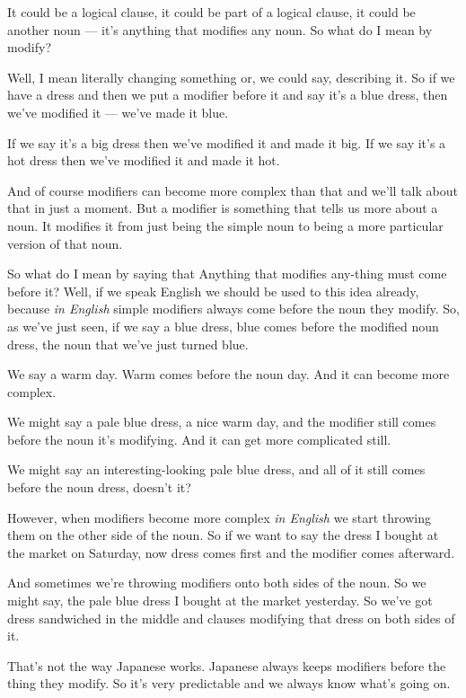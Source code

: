 It could be a logical clause, it could be part of a logical clause, it could be another noun --- it's anything that modifies any noun. So what do I mean by modify?

Well, I mean literally changing something or, we could say, describing it. So if we have a dress and then we put a modifier before it and say it's a blue dress, then we've modified it --- we've made it blue.

{}

If we say it's a big dress then we've modified it and made it big. If we say it's a hot dress then we've modified it and made it hot.

And of course modifiers can become more complex than that and we'll talk about that in just a moment. But a modifier is something that tells us more about a noun. It modifies it from just being the simple noun to being a more particular version of that noun.

So what do I mean by saying that Anything that modifies any-thing must come before it? Well, if we speak English we should be used to this idea already, because {\em in English} simple modifiers always come before the noun they modify. So, as we've just seen, if we say a blue dress, blue comes before the modified noun dress, the noun that we've just turned blue.

We say a warm day. Warm comes before the noun day. And it can become more complex.

We might say a pale blue dress, a nice warm day, and the modifier still comes before the noun it's modifying. And it can get more complicated still.

We might say an interesting-looking pale blue dress, and all of it still comes before the noun dress, doesn't it?

{}

However, when modifiers become more complex {\em in English} we start throwing them on the other side of the noun. So if we want to say the dress I bought at the market on Saturday, now dress comes first and the modifier comes afterward.

And sometimes we're throwing modifiers onto both sides of the noun. So we might say, the pale blue dress I bought at the market yesterday. So we've got dress sandwiched in the middle and clauses modifying that dress on both sides of it.

That's not the way Japanese works. Japanese always keeps modifiers before the thing they modify. So it's very predictable and we always know what's going on.


